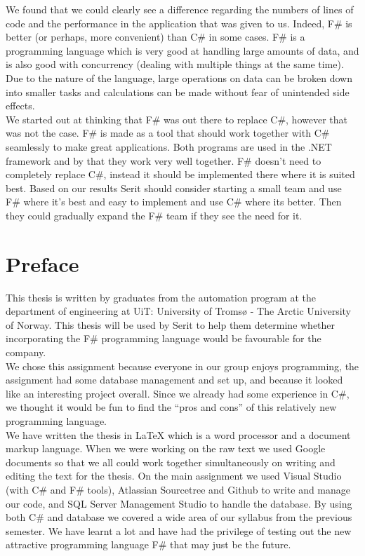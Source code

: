 \documentclass[12pt, a4paper]{article}
\begin{document}
We found that we could clearly see a difference regarding the numbers of lines of code and the performance in the application that was given to us. Indeed, F\# is better (or perhaps, more convenient) than C\# in some cases. F\# is a programming language which is very good at handling large amounts of data, and is also good with concurrency (dealing with multiple things at the same time). Due to the nature of the language, large operations on data can be broken down into smaller tasks and calculations can be made without fear of unintended side effects.\\

We started out at thinking that F\# was out there to replace C\#, however that was not the case. F\# is made as a tool that should work together with C\# seamlessly to make great applications. Both programs are used in the .NET framework and by that they work very well together. F\# doesn't need to completely replace C\#, instead it should be implemented there where it is suited best. Based on our results Serit should consider starting a small team and use F\# where it’s best and easy to implement and use C\# where its better. Then they could gradually expand the F\# team if they see the need for it.

\newpage
\section*{Preface}
This thesis is written by graduates from the automation program at the department of engineering  at UiT: University of Tromsø - The Arctic University of Norway. This thesis will be used by Serit to help them determine whether incorporating the F\# programming language would be favourable for the company.\\

We chose this assignment because everyone in our group enjoys programming, the assignment had some database management and set up, and because it looked like an interesting project overall. Since we already had some experience in C\#, we thought it would be fun to find the “pros and cons” of this relatively new programming language.\\

We have written the thesis in LaTeX which is a word processor and a document markup language. When we were working on the raw text we used Google documents so that we all could work together simultaneously on writing and editing the text for the thesis. On the main assignment we used Visual Studio (with C\# and F\# tools), Atlassian Sourcetree and Github to write and manage our code, and SQL Server Management Studio to handle the database. By using both C\# and database we covered a wide area of our syllabus from the previous semester. We have learnt a lot and have had the privilege of testing out the new attractive programming language F\# that may just be the future. \\
\end{document}
